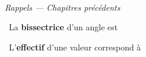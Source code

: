 \documentclass[a4paper,11pt]{article}
\newcommand{\coeurrappel}{\textcolor{Couleur6}{\faHeart}\ }
\begin{document}
\vspace{0.3cm}
\noindent{\textcolor{Couleur8}{\rule{\textwidth}{0.5pt}}}\\
{\small\textit{\textcolor{Couleur8}{Rappels --- Chapitres pr\'ec\'edents}}}
\vspace{0.1cm}

\noindent \coeurrappel La \textbf{bissectrice} d'un angle est \dotfill

\noindent \coeurrappel L'\textbf{effectif} d'une valeur correspond \`a \dotfill
\end{document}
